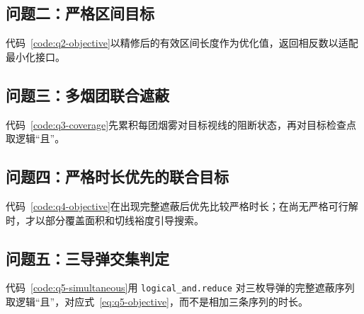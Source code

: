 \documentclass[12pt,a4paper]{article}
\begin{document}
\subsection{问题二：严格区间目标}

代码~\ref{code:q2-objective}以精修后的有效区间长度作为优化值，返回相反数以适配最小化接口。



\subsection{问题三：多烟团联合遮蔽}

代码~\ref{code:q3-coverage}先累积每团烟雾对目标视线的阻断状态，再对目标检查点取逻辑“且”。



\subsection{问题四：严格时长优先的联合目标}

代码~\ref{code:q4-objective}在出现完整遮蔽后优先比较严格时长；在尚无严格可行解时，才以部分覆盖面积和切线裕度引导搜索。



\subsection{问题五：三导弹交集判定}

代码~\ref{code:q5-simultaneous}用 \texttt{logical\_and.reduce} 对三枚导弹的完整遮蔽序列取逻辑“且”，对应式~\eqref{eq:q5-objective}，而不是相加三条序列的时长。


\end{document}
